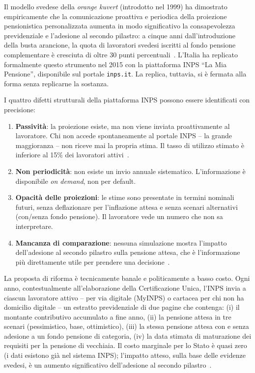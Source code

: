 Il modello svedese della \emph{orange kuvert} (introdotto nel 1999) ha
dimostrato empiricamente che la comunicazione proattiva e periodica della
proiezione pensionistica personalizzata aumenta in modo significativo la
consapevolezza previdenziale e l'adesione al secondo pilastro: a cinque
anni dall'introduzione della busta arancione, la quota di lavoratori svedesi
iscritti al fondo pensione complementare è cresciuta di oltre 30 punti
percentuali~\cite{Sundén2006}. L'Italia ha replicato formalmente questo
strumento nel 2015 con la piattaforma INPS ``La Mia Pensione'', disponibile
sul portale \texttt{inps.it}. La replica, tuttavia, si è fermata alla forma
senza replicarne la sostanza.

I quattro difetti strutturali della piattaforma INPS possono essere
identificati con precisione:
%
\begin{enumerate}
  \item \textbf{Passività}: la proiezione esiste, ma non viene inviata
    proattivamente al lavoratore. Chi non accede spontaneamente al portale
    INPS -- la grande maggioranza -- non riceve mai la propria stima.
    Il tasso di utilizzo stimato è inferiore al 15\% dei lavoratori
    attivi~\cite{INPS2024}.
  \item \textbf{Non periodicità}: non esiste un invio annuale sistematico.
    L'informazione è disponibile \emph{on demand}, non per default.
  \item \textbf{Opacità delle proiezioni}: le stime sono presentate in
    termini nominali futuri, senza deflazionare per l'inflazione attesa
    e senza scenari alternativi (con/senza fondo pensione). Il lavoratore
    vede un numero che non sa interpretare.
  \item \textbf{Mancanza di comparazione}: nessuna simulazione mostra
    l'impatto dell'adesione al secondo pilastro sulla pensione attesa,
    che è l'informazione più direttamente utile per prendere
    una decisione~\cite{INPS2024, Sundén2006}.
\end{enumerate}

La proposta di riforma è tecnicamente banale e politicamente a basso costo.
Ogni anno, contestualmente all'elaborazione della Certificazione Unica,
l'INPS invia a ciascun lavoratore attivo -- per via digitale (MyINPS) o
cartacea per chi non ha domicilio digitale -- un estratto previdenziale di
due pagine che contenga: (i) il montante contributivo accumulato a fine
anno, (ii) la pensione attesa in tre scenari (pessimistico, base,
ottimistico), (iii) la stessa pensione attesa con e senza adesione a un
fondo pensione di categoria, (iv) la data stimata di maturazione dei
requisiti per la pensione di vecchiaia. Il costo marginale per lo Stato
è quasi zero (i dati esistono già nel sistema INPS); l'impatto atteso,
sulla base delle evidenze svedesi, è un aumento significativo dell'adesione
al secondo pilastro~\cite{Sundén2006, ThalerSunstein2008}.

